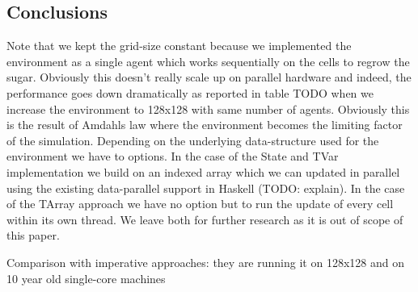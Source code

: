 \subsection{Conclusions}
Note that we kept the grid-size constant because we implemented the environment as a single agent which works sequentially on the cells to regrow the sugar. Obviously this doesn't really scale up on parallel hardware and indeed, the performance goes down dramatically as reported in table TODO when we increase the environment to 128x128 with same number of agents. Obviously this is the result of Amdahls law where the environment becomes the limiting factor of the simulation.
Depending on the underlying data-structure used for the environment we have to options. In the case of the State and TVar implementation we build on an indexed array which we can updated in parallel using the existing data-parallel support in Haskell (TODO: explain). In the case of the TArray approach we have no option but to run the update of every cell within its own thread. We leave both for further research as it is out of scope of this paper.

Comparison with imperative approaches: they are running it on 128x128 and on 10 year old single-core machines  \cite{lysenko_framework_2008}
